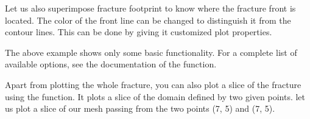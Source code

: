 \documentclass[letterpaper,10pt,english]{sphinxmanual}
\begin{document}
\sphinxAtStartPar
Let us also superimpose fracture footprint to know where the fracture front is located. The color of the front line can be changed to distinguish it from the contour lines. This can be done by giving it customized plot properties.

\begin{sphinxVerbatim}[commandchars=\\\{\}]
   

  
     
\end{sphinxVerbatim}


\sphinxAtStartPar
The above example shows only some basic functionality. For a complete list of available options, see the documentation of the  function.

\sphinxAtStartPar
Apart from plotting the whole fracture, you can also plot a slice of the fracture using the  function. It plots a slice of the domain defined by two given points. let us plot a slice of our mesh passing from the two points (\sphinxhyphen{}7, \sphinxhyphen{}5) and (7, 5).

\begin{sphinxVerbatim}[commandchars=\\\{\}]
 \PYG{p}{[} \PYG{p}{]} \PYG{p}{[} \PYG{p}{]}
\end{sphinxVerbatim}
\end{document}
